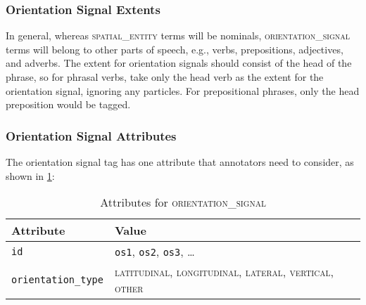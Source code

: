 \documentclass[11pt]{article}
\newenvironment{attributes}
{
\begin{tabular}{|l|l|}
    \hline \textbf{Attribute} & \textbf{Value}\\
}
{   \hline
\end{tabular}
}
\begin{document}
\fi

\subsubsection{Orientation Signal Extents} %
\label{ssub:orientation_signal_extents}
In general, whereas \textsc{spatial\_entity} terms will be nominals, \textsc{orientation\_signal} terms will belong to other parts of speech, e.g., verbs, prepositions, adjectives, and adverbs. The extent for orientation signals should consist of the head of the phrase, so for phrasal verbs, take only the head verb as the extent for the orientation signal, ignoring any particles. For prepositional phrases, only the head preposition would be tagged.


\subsubsection{Orientation Signal Attributes} %
\label{ssub:orientation_signal_attributes}

The orientation signal tag has one attribute that annotators need to consider, as shown in \cref{tab:orientation_signal}:

\begin{table}[h]
\centering
\begin{attributes}
    \hline \texttt{id}                  & \texttt{os1}, \texttt{os2}, 
                                          \texttt{os3}, \ldots\\
    \hline \texttt{orientation\_type}   & \textsc{latitudinal}, 
                                          \textsc{longitudinal}, 
                                          \textsc{lateral}, \textsc{vertical}, 
                                          \textsc{other}\\
\end{attributes}
\caption{Attributes for \textsc{orientation\_signal}}
\label{tab:orientation_signal}
\end{table}
\end{document}
